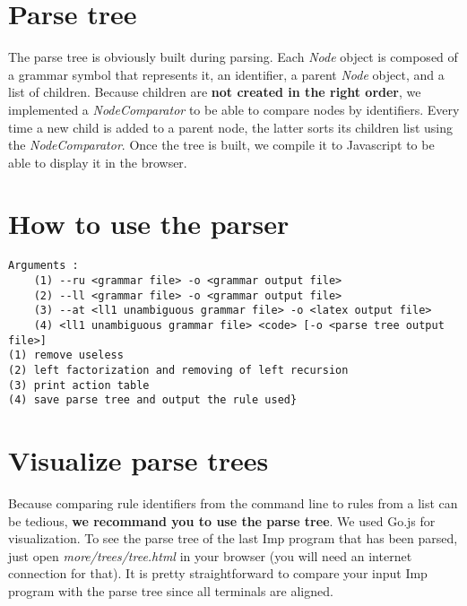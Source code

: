 \section{Parse tree}

The parse tree is obviously built during parsing. Each \textit{Node} object is composed of a grammar symbol that represents it,
an identifier, a parent \textit{Node} object, and a list of children. Because children are \textbf{not created in the right order},
we implemented a \textit{NodeComparator} to be able to compare nodes by identifiers. Every time a new child is added to a parent node,
the latter sorts its children list using the \textit{NodeComparator}. Once the tree is built, we compile it to Javascript to be able
to display it in the browser.

\section{How to use the parser}

\begin{lstlisting}
Arguments :
	(1) --ru <grammar file> -o <grammar output file>
	(2) --ll <grammar file> -o <grammar output file>
	(3) --at <ll1 unambiguous grammar file> -o <latex output file>
	(4) <ll1 unambiguous grammar file> <code> [-o <parse tree output file>]
(1) remove useless
(2) left factorization and removing of left recursion
(3) print action table
(4) save parse tree and output the rule used}
\end{lstlisting}


\section{Visualize parse trees}

Because comparing rule identifiers from the command line to rules from a list can be tedious,
\textbf{we recommand you to use the parse tree}. We used Go.js for visualization.
To see the parse tree of the last Imp program that has been parsed, just open \textit{more/trees/tree.html}
in your browser (you will need an internet connection for that).
It is pretty straightforward to compare your input Imp program with the parse tree since all terminals
are aligned.
